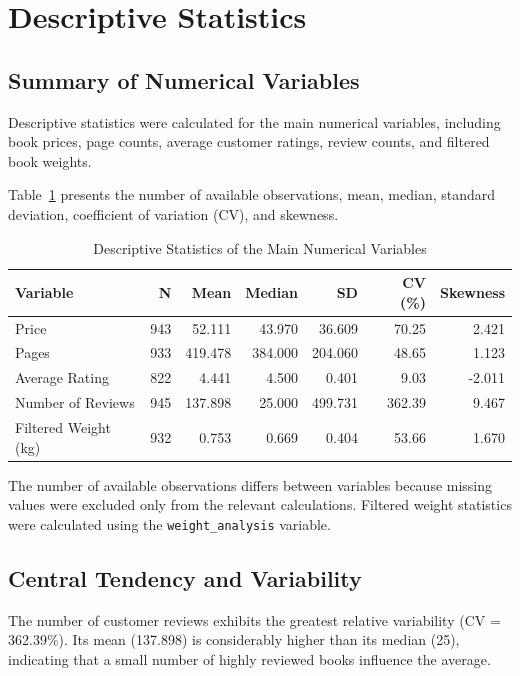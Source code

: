 \documentclass[11pt,a4paper]{article}
\begin{document}
\section{Descriptive Statistics}

\subsection{Summary of Numerical Variables}

Descriptive statistics were calculated for the main numerical
variables, including book prices, page counts, average customer
ratings, review counts, and filtered book weights.

Table~\ref{tab:descriptive} presents the number of available
observations, mean, median, standard deviation, coefficient
of variation (CV), and skewness.

\begin{table}[H]
\centering
\small
\begin{tabular}{lrrrrrr}
\toprule
Variable & N & Mean & Median & SD & CV (\%) & Skewness \\
\midrule
Price & 943 & 52.111 & 43.970 & 36.609 & 70.25 & 2.421 \\
Pages & 933 & 419.478 & 384.000 & 204.060 & 48.65 & 1.123 \\
Average Rating & 822 & 4.441 & 4.500 & 0.401 & 9.03 & -2.011 \\
Number of Reviews & 945 & 137.898 & 25.000 & 499.731 & 362.39 & 9.467 \\
Filtered Weight (kg) & 932 & 0.753 & 0.669 & 0.404 & 53.66 & 1.670 \\
\bottomrule
\end{tabular}
\caption{Descriptive Statistics of the Main Numerical Variables}
\label{tab:descriptive}
\end{table}

The number of available observations differs between variables
because missing values were excluded only from the relevant
calculations. Filtered weight statistics were calculated using
the \texttt{weight\_analysis} variable.
\subsection{Central Tendency and Variability}
The number of customer reviews exhibits the greatest relative
variability (CV = 362.39\%). Its mean (137.898) is considerably
higher than its median (25), indicating that a small number of
highly reviewed books influence the average.
\end{document}
